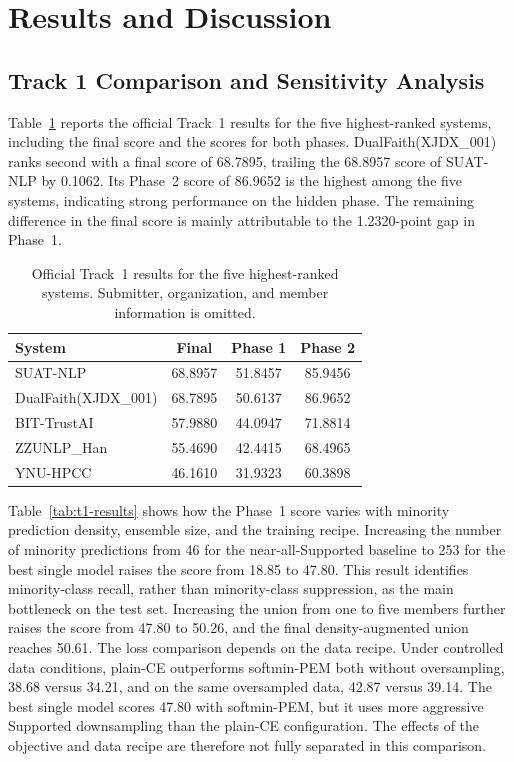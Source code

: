 \documentclass[runningheads]{llncs}
\newcommand{\sys}{XJDX\_001}
\newcommand{\method}{DualFaith}
\newcommand{\lab}[1]{\textsf{\small #1}}
\newcommand{\best}[1]{#1}
\begin{document}
\section{Results and Discussion}

\subsection{Track 1 Comparison and Sensitivity Analysis}
\label{sec:t1-sensitivity}
Table~\ref{tab:t1-leaderboard} reports the official Track~1 results for the five highest-ranked systems, including the final score and the scores for both phases. \method{}(\sys{}) ranks second with a final score of 68.7895, trailing the 68.8957 score of SUAT-NLP by 0.1062. Its Phase~2 score of 86.9652 is the highest among the five systems, indicating strong performance on the hidden phase. The remaining difference in the final score is mainly attributable to the 1.2320-point gap in Phase~1.

\begin{table}[H]
\centering
\caption{Official Track~1 results for the five highest-ranked systems. Submitter, organization, and member information is omitted.}
\label{tab:t1-leaderboard}
\small
\begin{tabular}{lccc}
\toprule
System & Final & Phase 1 & Phase 2\\
\midrule
SUAT-NLP & \best{68.8957} & \best{51.8457} & 85.9456\\
\method{}(\sys{}) & 68.7895 & 50.6137 & \best{86.9652}\\
BIT-TrustAI & 57.9880 & 44.0947 & 71.8814\\
ZZUNLP\_Han & 55.4690 & 42.4415 & 68.4965\\
YNU-HPCC & 46.1610 & 31.9323 & 60.3898\\
\bottomrule
\end{tabular}
\end{table}

Table~\ref{tab:t1-results} shows how the Phase~1 score varies with minority prediction density, ensemble size, and the training recipe. Increasing the number of minority predictions from 46 for the near-all-\lab{Supported} baseline to 253 for the best single model raises the score from 18.85 to 47.80. This result identifies minority-class recall, rather than minority-class suppression, as the main bottleneck on the test set. Increasing the union from one to five members further raises the score from 47.80 to 50.26, and the final density-augmented union reaches 50.61. The loss comparison depends on the data recipe. Under controlled data conditions, plain-CE outperforms softmin-PEM both without oversampling, 38.68 versus 34.21, and on the same oversampled data, 42.87 versus 39.14. The best single model scores 47.80 with softmin-PEM, but it uses more aggressive \lab{Supported} downsampling than the plain-CE configuration. The effects of the objective and data recipe are therefore not fully separated in this comparison.
\end{document}
